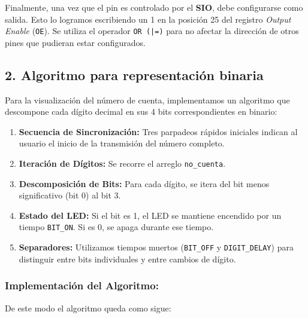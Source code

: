 \documentclass[12pt,letterpaper]{article}
\begin{document}
\noindent
Finalmente, una vez que el pin es controlado por el \textbf{SIO}, debe configurarse como salida. Esto lo logramos escribiendo un 1 en la posición 25 del registro \textit{Output Enable} (\texttt{OE}). Se utiliza el operador \texttt{OR (|=)} para no afectar la dirección de otros pines que pudieran estar configurados.

\subsection*{2. Algoritmo para representación binaria}

Para la visualización del número de cuenta, implementamos un algoritmo que descompone cada dígito decimal en sus 4 bits correspondientes en binario:

\begin{enumerate}
\item \textbf{Secuencia de Sincronización:} Tres parpadeos rápidos iniciales indican al usuario el inicio de la transmisión del número completo.
\item \textbf{Iteración de Dígitos:} Se recorre el arreglo \texttt{no\_cuenta}.
\item \textbf{Descomposición de Bits:} Para cada dígito, se itera del bit menos significativo (bit 0) al bit 3.
\item \textbf{Estado del LED:} Si el bit es 1, el LED se mantiene encendido por un tiempo \texttt{BIT\_ON}. Si es 0, se apaga durante ese tiempo.
\item \textbf{Separadores:} Utilizamos tiempos muertos (\texttt{BIT\_OFF} y \texttt{DIGIT\_DELAY}) para distinguir entre bits individuales y entre cambios de dígito.
\end{enumerate}

\subsubsection*{Implementación del Algoritmo:}

De este modo el algoritmo queda como sigue:
\end{document}
